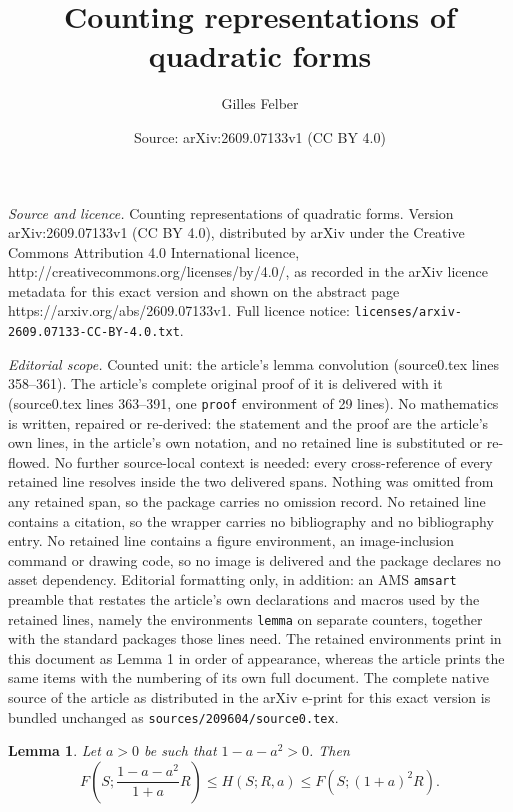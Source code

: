 \documentclass[10pt,a4paper]{amsart}
\title{Counting representations of quadratic forms}
\author{Gilles Felber}
\date{Source: arXiv:2609.07133v1 (CC BY 4.0)}
\newtheorem{lemma}{Lemma}
\begin{document}
\maketitle

\noindent\emph{Source and licence.} Counting representations of quadratic forms. Version arXiv:2609.07133v1 (CC BY 4.0), distributed by arXiv under the Creative Commons Attribution 4.0 International licence, http://creativecommons.org/licenses/by/4.0/, as recorded in the arXiv licence metadata for this exact version and shown on the abstract page https://arxiv.org/abs/2609.07133v1. Full licence notice: \texttt{licenses/arxiv-2609.07133-CC-BY-4.0.txt}.\par\smallskip

\noindent\textit{Editorial scope.} Counted unit: the article's lemma convolution (source0.tex lines 358--361). The article's complete original proof of it is delivered with it (source0.tex lines 363--391, one \texttt{proof} environment of 29 lines). No mathematics is written, repaired or re-derived: the statement and the proof are the article's own lines, in the article's own notation, and no retained line is substituted or re-flowed.  No further source-local context is needed: every cross-reference of every retained line resolves inside the two delivered spans.  Nothing was omitted from any retained span, so the package carries no omission record.  No retained line contains a citation, so the wrapper carries no bibliography and no bibliography entry.  No retained line contains a figure environment, an image-inclusion command or drawing code, so no image is delivered and the package declares no asset dependency.  Editorial formatting only, in addition: an AMS \texttt{amsart} preamble that restates the article's own declarations and macros used by the retained lines, namely the environments \texttt{lemma} on separate counters, together with the standard packages those lines need.  The retained environments print in this document as Lemma 1 in order of appearance, whereas the article prints the same items with the numbering of its own full document.  The complete native source of the article as distributed in the arXiv e-print for this exact version is bundled unchanged as \texttt{sources/209604/source0.tex}.
\begin{lemma}\label{lem bounds convolution}
Let $a>0$ be such that $1-a-a^2>0$. Then
$$F\left(S;\frac{1-a-a^2}{1+a}R\right)\leq H(S;R,a)\leq F(S;(1+a)^2R).$$
\end{lemma}
\end{document}
